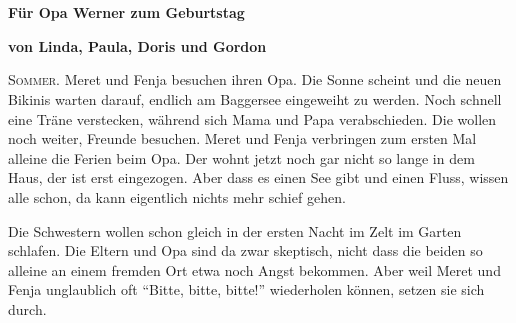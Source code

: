 \pagestyle{empty}
\section*{}
\centerline{\Huge \color{red}\SixFlowerPetalDotted}
\vspace{13pt}
\centerline{\bf \large\color{red}Für Opa Werner zum Geburtstag }
\vspace{13pt}
\centerline{\bf \color{red} von Linda, Paula, Doris und Gordon}
\vspace{13pt}
\centerline{\huge \color{red}\SixFlowerPetalDotted}
\vspace{13pt}
\centerline{\LARGE \color{red}\SixFlowerPetalDotted}
\vspace{13pt}
\centerline{\Large \color{red}\SixFlowerPetalDotted}
\vspace{13pt}
\centerline{\large \color{red}\SixFlowerPetalDotted}
\vspace{13pt}
\centerline{\normalsize \color{red}\SixFlowerPetalDotted}
\vspace{13pt}
\centerline{\small \color{red}\SixFlowerPetalDotted}
\vspace{13pt}
\centerline{\footnotesize \color{red}\SixFlowerPetalDotted}
\vspace{13pt}
\centerline{\scriptsize \color{red}\SixFlowerPetalDotted}
\vspace{13pt}
\centerline{\tiny \color{red}\SixFlowerPetalDotted}

\newpage
\pagestyle{scrheadings}


\lettrine[lines=3]{\color{red}S}{ommer.} Meret und Fenja besuchen ihren Opa. Die Sonne scheint und die neuen Bikinis warten darauf, endlich am Baggersee eingeweiht zu werden. Noch schnell eine Träne verstecken, während sich Mama und Papa verabschieden. Die wollen noch weiter, Freunde besuchen. Meret und Fenja verbringen zum ersten Mal alleine die Ferien beim Opa. Der wohnt jetzt noch gar nicht so lange in dem Haus, der ist erst eingezogen. Aber dass es einen See gibt und einen Fluss, wissen alle schon, da kann eigentlich nichts mehr schief gehen.

Die Schwestern wollen schon gleich in der ersten Nacht im Zelt im Garten schlafen. Die Eltern und Opa sind da zwar skeptisch, nicht dass die beiden  so alleine an einem fremden Ort etwa noch Angst bekommen. Aber weil Meret und Fenja unglaublich oft \enquote{Bitte, bitte, bitte!} wiederholen können, setzen sie sich durch.

